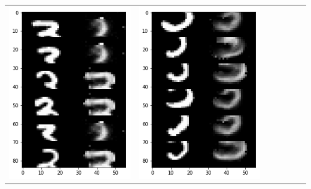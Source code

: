 \documentclass[12pt]{report} %
\begin{document}
\begin{tabular}{m{0.7cm}m{2.4cm}m{2.4cm}m{2.4cm}m{2.4cm}m{2.4cm}m{2.4cm}}
	\includegraphics[scale=0.3]{pictures/M1_3_up.png} & \includegraphics[scale=0.3]{pictures/M1_3_down.png} &

\end{tabular}
\end{document}
